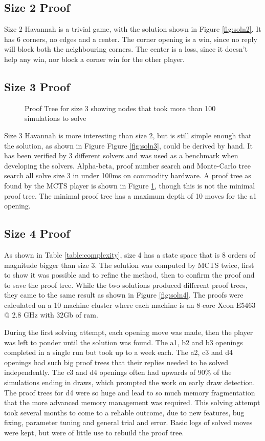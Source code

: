 \subsection{Size 2 Proof}

Size 2 Havannah is a trivial game, with the solution shown in Figure \ref{fig:soln2}. It has 6 corners, no edges and a center. The corner opening is a win, since no reply will block both the neighbouring corners. The center is a loss, since it doesn't help any win, nor block a corner win for the other player.

\subsection{Size 3 Proof}

\begin{figure}
\centering

\caption{Proof Tree for size 3 showing nodes that took more than 100 simulations to solve}
\label{fig:proof3}
\end{figure}

Size 3 Havannah is more interesting than size 2, but is still simple enough that the solution, as shown in Figure Figure \ref{fig:soln3}, could be derived by hand. It has been verified by 3 different solvers and was used as a benchmark when developing the solvers. Alpha-beta, proof number search and Monte-Carlo tree search all solve size 3 in under 100ms on commodity hardware. A proof tree as found by the MCTS player is shown in Figure \ref{fig:proof3}, though this is not the minimal proof tree. The minimal proof tree has a maximum depth of 10 moves for the a1 opening.


\subsection{Size 4 Proof}\label{sec:size4proof}

As shown in Table \ref{table:complexity}, size 4  has a state space that is 8 orders of magnitude bigger than size 3. The solution was computed by MCTS twice, first to show it was possible and to refine the method, then to confirm the proof and to save the proof tree. While the two solutions produced different proof trees, they came to the same result as shown in Figure \ref{fig:soln4}. The proofs were calculated on a 10 machine cluster where each machine is an 8-core Xeon E5463 @ 2.8 GHz with 32Gb of ram.

During the first solving attempt, each opening move was made, then the player was left to ponder until the solution was found. The a1, b2 and b3 openings completed in a single run but took up to a week each. The a2, c3 and d4 openings had such big proof trees that their replies needed to be solved independently. The c3 and d4 openings often had upwards of 90\% of the simulations ending in draws, which prompted the work on early draw detection. The proof trees for d4 were so huge and lead to so much memory fragmentation that the more advanced memory management was required. This solving attempt took several months to come to a reliable outcome, due to new features, bug fixing, parameter tuning and general trial and error. Basic logs of solved moves were kept, but were of little use to rebuild the proof tree.

